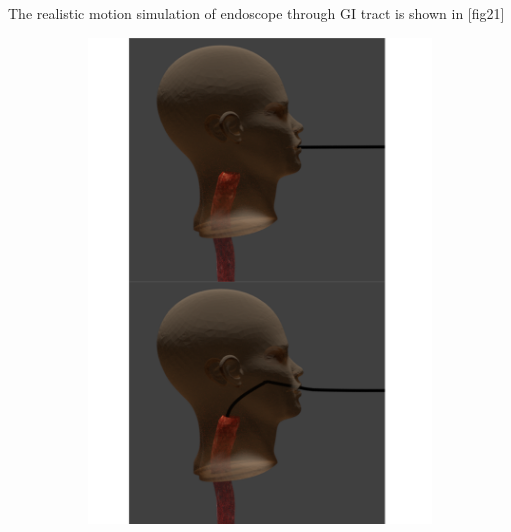 \documentclass[12pt,a4]{article}
\begin{document}
The realistic motion simulation of endoscope through GI tract is shown in [fig21]

\begin{figure}[ht!]
    \centering
    \begin{subfigure}{0.28\textwidth}
        \centering
        \includegraphics[width=0.95\linewidth]{figures/GIsnaps/1.png}
   

\end{subfigure}
\end{figure}
\end{document}
